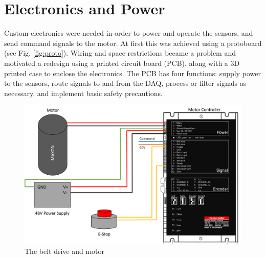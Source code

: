 \documentclass[12pt]{report}
\begin{document}
	
		
	\section{Electronics and Power}
	
	Custom electronics were needed in order to power and operate the sensors, and send command signals to the motor. At first this was achieved using a protoboard (see Fig. \ref{fig:proto}). Wiring and space restrictions became a problem and motivated a redesign using a printed circuit board (PCB), along with a 3D printed case to enclose the electronics. The PCB has four functions: supply power to the sensors, route signals to and from the DAQ, process or filter signals as necessary, and implement basic safety precautions. 
	
		
	\begin{figure}[h] 
		\centering
		\includegraphics[width=0.9\linewidth]{Motor_setup}
		\caption{The belt drive and motor}
		\label{fig:actuator}
	\end{figure}
		
	
	
\end{document}
